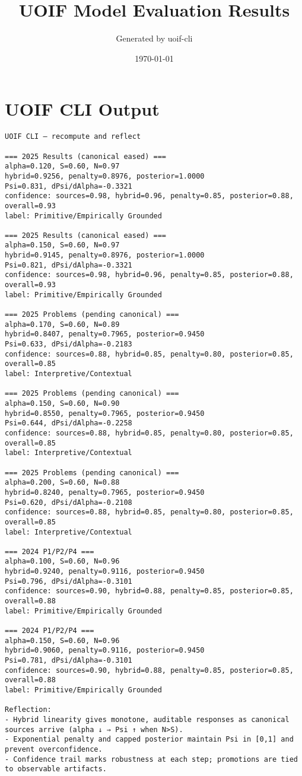\documentclass{article}
\title{UOIF Model Evaluation Results}
\author{Generated by uoif-cli}
\date{\today}
\begin{document}
\maketitle

\section*{UOIF CLI Output}

\begin{verbatim}
UOIF CLI — recompute and reflect

=== 2025 Results (canonical eased) ===
alpha=0.120, S=0.60, N=0.97
hybrid=0.9256, penalty=0.8976, posterior=1.0000
Psi=0.831, dPsi/dAlpha=-0.3321
confidence: sources=0.98, hybrid=0.96, penalty=0.85, posterior=0.88, overall=0.93
label: Primitive/Empirically Grounded

=== 2025 Results (canonical eased) ===
alpha=0.150, S=0.60, N=0.97
hybrid=0.9145, penalty=0.8976, posterior=1.0000
Psi=0.821, dPsi/dAlpha=-0.3321
confidence: sources=0.98, hybrid=0.96, penalty=0.85, posterior=0.88, overall=0.93
label: Primitive/Empirically Grounded

=== 2025 Problems (pending canonical) ===
alpha=0.170, S=0.60, N=0.89
hybrid=0.8407, penalty=0.7965, posterior=0.9450
Psi=0.633, dPsi/dAlpha=-0.2183
confidence: sources=0.88, hybrid=0.85, penalty=0.80, posterior=0.85, overall=0.85
label: Interpretive/Contextual

=== 2025 Problems (pending canonical) ===
alpha=0.150, S=0.60, N=0.90
hybrid=0.8550, penalty=0.7965, posterior=0.9450
Psi=0.644, dPsi/dAlpha=-0.2258
confidence: sources=0.88, hybrid=0.85, penalty=0.80, posterior=0.85, overall=0.85
label: Interpretive/Contextual

=== 2025 Problems (pending canonical) ===
alpha=0.200, S=0.60, N=0.88
hybrid=0.8240, penalty=0.7965, posterior=0.9450
Psi=0.620, dPsi/dAlpha=-0.2108
confidence: sources=0.88, hybrid=0.85, penalty=0.80, posterior=0.85, overall=0.85
label: Interpretive/Contextual

=== 2024 P1/P2/P4 ===
alpha=0.100, S=0.60, N=0.96
hybrid=0.9240, penalty=0.9116, posterior=0.9450
Psi=0.796, dPsi/dAlpha=-0.3101
confidence: sources=0.90, hybrid=0.88, penalty=0.85, posterior=0.85, overall=0.88
label: Primitive/Empirically Grounded

=== 2024 P1/P2/P4 ===
alpha=0.150, S=0.60, N=0.96
hybrid=0.9060, penalty=0.9116, posterior=0.9450
Psi=0.781, dPsi/dAlpha=-0.3101
confidence: sources=0.90, hybrid=0.88, penalty=0.85, posterior=0.85, overall=0.88
label: Primitive/Empirically Grounded

Reflection:
- Hybrid linearity gives monotone, auditable responses as canonical sources arrive (alpha ↓ ⇒ Psi ↑ when N>S).
- Exponential penalty and capped posterior maintain Psi in [0,1] and prevent overconfidence.
- Confidence trail marks robustness at each step; promotions are tied to observable artifacts.

\end{verbatim}
\end{document}
